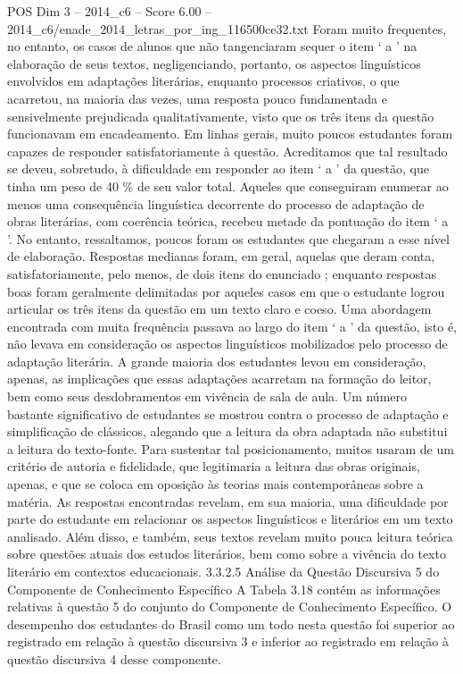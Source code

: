 \begin{textsample}{POS Dim 3 – 2014\_c6 – Score 6.00 – 2014\_c6/enade\_2014\_letras\_por\_ing\_116500ce32.txt}
Foram muito frequentes, no entanto, os casos de alunos que não tangenciaram sequer o item ‘ a ’ na elaboração de seus textos, negligenciando, portanto, os aspectos linguísticos envolvidos em adaptações literárias, enquanto processos criativos, o que acarretou, na maioria das vezes, uma resposta pouco fundamentada e sensivelmente prejudicada qualitativamente, visto que os três itens da questão funcionavam em encadeamento.
Em linhas gerais, muito poucos estudantes foram capazes de responder satisfatoriamente à questão.
Acreditamos que tal resultado se deveu, sobretudo, à dificuldade em responder ao item ‘ a ’ da questão, que tinha um peso de 40 \% de seu valor total.
Aqueles que conseguiram enumerar ao menos uma consequência linguística decorrente do processo de adaptação de obras literárias, com coerência teórica, recebeu metade da pontuação do item ‘ a ’.
No entanto, ressaltamos, poucos foram os estudantes que chegaram a esse nível de elaboração.
Respostas medianas foram, em geral, aquelas que deram conta, satisfatoriamente, pelo menos, de dois itens do enunciado ; enquanto respostas boas foram geralmente delimitadas por aqueles casos em que o estudante logrou articular os três itens da questão em um texto claro e coeso.
Uma abordagem encontrada com muita frequência passava ao largo do item ‘ a ’ da questão, isto é, não levava em consideração os aspectos linguísticos mobilizados pelo processo de adaptação literária.
A grande maioria dos estudantes levou em consideração, apenas, as implicações que essas adaptações acarretam na formação do leitor, bem como seus desdobramentos em vivência de sala de aula.
Um número bastante significativo de estudantes se mostrou contra o processo de adaptação e simplificação de clássicos, alegando que a leitura da obra adaptada não substitui a leitura do texto-fonte.
Para sustentar tal posicionamento, muitos usaram de um critério de autoria e fidelidade, que legitimaria a leitura das obras originais, apenas, e que se coloca em oposição às teorias mais contemporâneas sobre a matéria.
As respostas encontradas revelam, em sua maioria, uma dificuldade por parte do estudante em relacionar os aspectos linguísticos e literários em um texto analisado.
Além disso, e também, seus textos revelam muito pouca leitura teórica sobre questões atuais dos estudos literários, bem como sobre a vivência do texto literário em contextos educacionais. 3.3.2.5 Análise da Questão Discursiva 5 do Componente de Conhecimento Específico A Tabela 3.18 contém as informações relativas à questão 5 do conjunto do Componente de Conhecimento Específico.
O desempenho dos estudantes do Brasil como um todo nesta questão foi superior ao registrado em relação à questão discursiva 3 e inferior ao registrado em relação à questão discursiva 4 desse componente.

\end{textsample}
